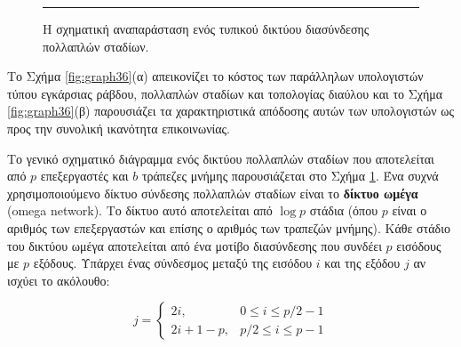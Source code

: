 \documentclass[12pt,a4paper]{article}
\begin{document}
\begin{figure}[H]
\noindent\rule{\textwidth}{0.2pt}
\caption{Η σχηματική αναπαράσταση ενός τυπικού δικτύου διασύνδεσης
πολλαπλών σταδίων.}
\label{fig:graph35}
\end{figure}
\vspace{0.3cm}

\noindent Το Σχήμα \ref{fig:graph36}(α) απεικονίζει το κόστος των παράλληλων 
υπολογιστών τύπου εγκάρσιας ράβδου, πολλαπλών σταδίων και τοπολογίας 
διαύλου και το Σχήμα \ref{fig:graph36}(β) παρουσιάζει τα χαρακτηριστικά 
απόδοσης αυτών των υπολογιστών ως προς την συνολική ικανότητα επικοινωνίας.

Το γενικό σχηματικό διάγραμμα ενός δικτύου πολλαπλών σταδίων που αποτελείται 
από $p$ επεξεργαστές και $b$ τράπεζες μνήμης παρουσιάζεται στο Σχήμα \ref{fig:graph35}. 
Ένα συχνά χρησιμοποιούμενο δίκτυο σύνδεσης πολλαπλών σταδίων είναι το \textbf{δίκτυο ωμέγα}
(\foreignlanguage{english}{omega network}). Το δίκτυο αυτό αποτελείται από 
$\log p$ στάδια (όπου $p$ είναι ο αριθμός των επεξεργαστών και επίσης ο 
αριθμός των τραπεζών μνήμης). Κάθε στάδιο του δικτύου ωμέγα αποτελείται 
από ένα μοτίβο διασύνδεσης που συνδέει $p$ εισόδους με $p$ εξόδους. 
Υπάρχει ένας σύνδεσμος μεταξύ της εισόδου $i$ και της εξόδου $j$ αν ισχύει
το ακόλουθο:

\begin{equation}
j =
\begin{cases}
2i, & 0 \leq i \leq p/2 - 1 \\
2i + 1 - p, & p/2 \leq i \leq p - 1
\end{cases}
\label{eq:relation17}
\end{equation}
\end{document}
